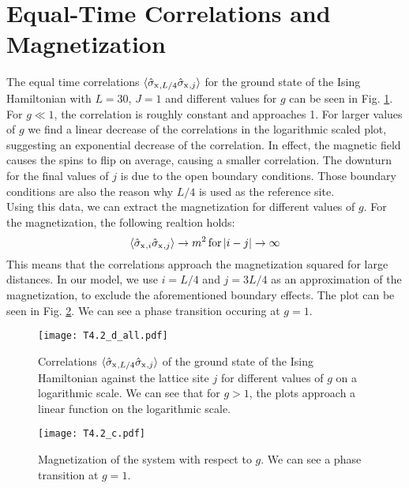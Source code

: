 \section{Equal-Time Correlations and Magnetization}

The equal time correlations $\langle \sigmax{}_{,L/4}\sigmax{}_{,j}\rangle $ for the ground state of the Ising Hamiltonian with $L=30$, $J=1$ and different values for $g$ can be seen in Fig. \ref{fig:correlation-g}. For $g\ll 1$, the correlation is roughly constant and approaches 1. For larger values of $g$ we find a linear decrease of the correlations in the logarithmic scaled plot, suggesting an exponential decrease of the correlation. In effect, the magnetic field causes the spins to flip on average, causing a smaller correlation. The downturn for the final values of $j$ is due to the open boundary conditions. Those boundary conditions are also the reason why $L/4$ is used as the reference site.\\
Using this data, we can extract the magnetization for different values of $g$. For the magnetization, the following realtion holds:
\begin{equation}
    \langle \sigmax{}_{,i}\sigmax{}_{,j}\rangle \rightarrow m^2\,\text{for}\, |i-j|\rightarrow \infty
\end{equation}
This means that the correlations approach the magnetization squared for large distances. In our model, we use $i=L/4$ and $j=3L/4$  as an approximation of the magnetization, to exclude the aforementioned boundary effects. The plot can be seen in Fig. \ref{fig:magnetization}. We can see a phase transition occuring at $g=1$. %
\begin{figure}[htbp]
    \centering
    \texttt{[image: T4.2\_d\_all.pdf]}
    \caption{Correlations $\langle \sigmax{}_{,L/4}\sigmax{}_{,j}\rangle $ of the ground state of the Ising Hamiltonian against the lattice site $j$ for different values of $g$ on a logarithmic scale. We can see that for $g>1$, the plots approach a linear function on the logarithmic scale.}
    \label{fig:correlation-g}
\end{figure}
\begin{figure}[htbp]
    \centering
    \texttt{[image: T4.2\_c.pdf]}
    \caption{Magnetization of the system with respect to $g$. We can see a phase transition at $g=1$.}
    \label{fig:magnetization}
\end{figure}

